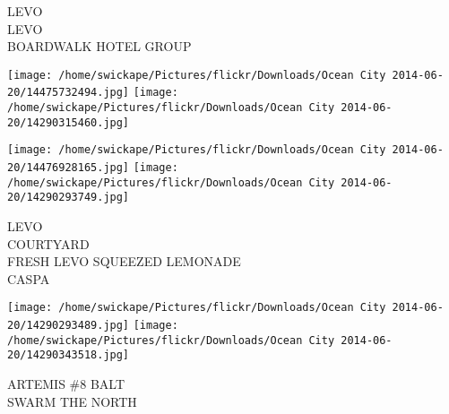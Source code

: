 \documentclass[10pt,letterpaper]{article}
\begin{document}
LEVO\\
LEVO\\
BOARDWALK HOTEL GROUP
\pagebreak

\texttt{[image: /home/swickape/Pictures/flickr/Downloads/Ocean City 2014-06-20/14475732494.jpg]}
\texttt{[image: /home/swickape/Pictures/flickr/Downloads/Ocean City 2014-06-20/14290315460.jpg]}

\texttt{[image: /home/swickape/Pictures/flickr/Downloads/Ocean City 2014-06-20/14476928165.jpg]}
\texttt{[image: /home/swickape/Pictures/flickr/Downloads/Ocean City 2014-06-20/14290293749.jpg]}

LEVO\\
COURTYARD\\
FRESH LEVO SQUEEZED LEMONADE\\
CASPA
\pagebreak

\texttt{[image: /home/swickape/Pictures/flickr/Downloads/Ocean City 2014-06-20/14290293489.jpg]}
\texttt{[image: /home/swickape/Pictures/flickr/Downloads/Ocean City 2014-06-20/14290343518.jpg]}

ARTEMIS \#8 BALT\\
SWARM THE NORTH
\pagebreak
\end{document}
